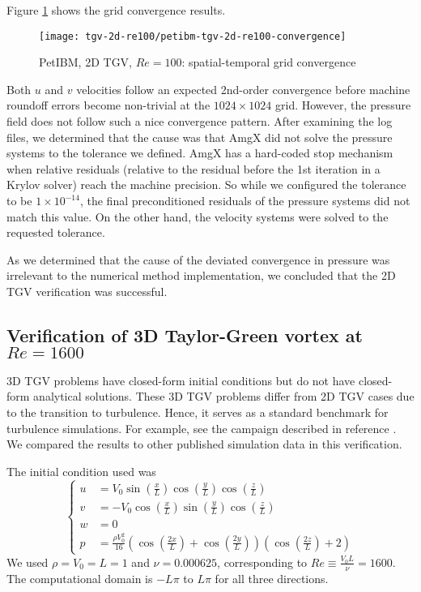 Figure \ref{fig:petibm-tgv2d-re100-conv} shows the grid convergence results.
\begin{figure}[hbt!]
    \texttt{[image: tgv-2d-re100/petibm-tgv-2d-re100-convergence]}
    \caption{PetIBM, 2D TGV, $Re=100$: spatial-temporal grid convergence}
    \label{fig:petibm-tgv2d-re100-conv}
\end{figure}
Both $u$ and $v$ velocities follow an expected 2nd-order convergence before machine roundoff errors become non-trivial at the $1024 \times 1024$ grid.
However, the pressure field does not follow such a nice convergence pattern.
After examining the log files, we determined that the cause was that AmgX did not solve the pressure systems to the tolerance we defined.
AmgX has a hard-coded stop mechanism when relative residuals (relative to the residual before the 1st iteration in a Krylov solver) reach the machine precision.
So while we configured the tolerance to be $1\times 10^{-14}$, the final preconditioned residuals of the pressure systems did not match this value.
On the other hand, the velocity systems were solved to the requested tolerance.

As we determined that the cause of the deviated convergence in pressure was irrelevant to the numerical method implementation, we concluded that the 2D TGV verification was successful.

\subsection*{Verification of 3D Taylor-Green vortex at $Re=1600$}

3D TGV problems have closed-form initial conditions but do not have closed-form analytical solutions.
These 3D TGV problems differ from 2D TGV cases due to the transition to turbulence.
Hence, it serves as a standard benchmark for turbulence simulations.
For example, see the campaign described in reference \cite{noauthor_1st_2012}. 
We compared the results to other published simulation data \cite{debonis_solutions_2013} in this verification.

The initial condition used was
\begin{equation}\label{eq:tgv3d-ic}
    \left\{
    \begin{aligned}
        u &=V_{0} \sin \left(\frac{x}{L}\right) \cos \left(\frac{y}{L}\right) \cos \left(\frac{z}{L}\right) \\
        v &=-V_{0} \cos \left(\frac{x}{L}\right) \sin \left(\frac{y}{L}\right) \cos \left(\frac{z}{L}\right) \\
        w &=0 \\
        p &=\frac{\rho V_{0}^{2}}{16}\left(\cos \left(\frac{2 x}{L}\right)+\cos \left(\frac{2 y}{L}\right)\right)\left(\cos \left(\frac{2 z}{L}\right)+2\right)
    \end{aligned}
    \right.
\end{equation}
We used $\rho = V_0 = L = 1$ and $\nu=0.000625$, corresponding to $Re \equiv \frac{V_0 L}{\nu} = 1600$.
The computational domain is $-L\pi$ to $L\pi$ for all three directions.

